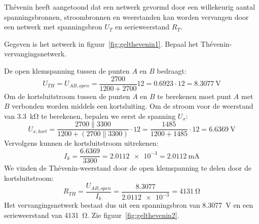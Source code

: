 Th\'evenin heeft aangetoond dat een netwerk gevormd door een willekeurig aantal spanningsbronnen,
stroombronnen en weerstanden kan worden vervangen door een netwerk met spanningsbron $U_T$ en
serieweerstand $R_T$.

\begin{example}
Gegeven is het netwerk in figuur~\ref{fig:gelthevenin1}. Bepaal het Thévenin-vervangingsnetwerk.

\begin{center}
\label{fig:gelthevenin1}
\end{center}

De open klemspanning tussen de punten $A$ en $B$ bedraagt:
%
\begin{equation}
U_{TH} = U_{AB,open} = \dfrac{2700}{1200+2700}12 = \num{0.6923}\cdot12 = \SI{8.3077}{\volt}
\end{equation}
%
Om de kortsluitstroom tussen de punten $A$ en $B$ te berekenen moet punt $A$ met $B$ verbonden worden middels een kortsluiting. Om de stroom voor de weerstand van \SI{3.3}{\kilo\ohm} te berekenen, bepalen we eerst de spanning $U_x$:
%
\begin{equation}
U_{x,kort} = \dfrac{2700\parallel3300}{1200 + (2700\parallel3300)}\cdot12 = \dfrac{1485}{1200+1485}\cdot12 = \SI{6.6369}{\volt}
\end{equation}
%
Vervolgens kunnen de kortsluitstroom uitrekenen:
%
\begin{equation}
I_k = \dfrac{\num{6.6369}}{\num{3300}} = \num{2.0112e-3} = \SI{2.0112}{\mA}
\end{equation}
%
We vinden de Thévenin-weerstand door de open klemspanning te delen door de kortsluitstroom:
%
\begin{equation}
R_{TH} = \dfrac{U_{AB,open}}{I_k} = \dfrac{\num{8.3077}}{\num{2.0112e-3}} = \SI{4131}{\ohm}
\end{equation}
%
Het vervangingsnetwerk bestaat dus uit een spanningsbron van \SI{8.3077}{\volt} en een serieweerstand van \SI{4131}{\ohm}. Zie figuur~\ref{fig:gelthevenin2}.

\begin{center}
\label{fig:gelthevenin2}
\end{center}
\end{example}


